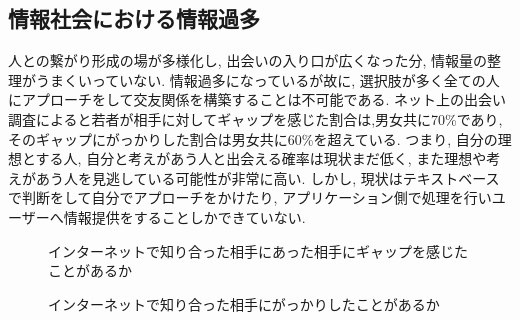 \subsection{情報社会における情報過多}
人との繋がり形成の場が多様化し, 出会いの入り口が広くなった分, 情報量の整理がうまくいっていない.
情報過多になっているが故に, 選択肢が多く全ての人にアプローチをして交友関係を構築することは不可能である.
ネット上の出会い調査によると若者が相手に対してギャップを感じた割合は,男女共に70\%であり,
そのギャップにがっかりした割合は男女共に60\%を超えている.\cite{mandam}
つまり, 自分の理想とする人, 自分と考えがあう人と出会える確率は現状まだ低く, また理想や考えがあう人を見逃している可能性が非常に高い.
しかし, 現状はテキストベースで判断をして自分でアプローチをかけたり, アプリケーション側で処理を行いユーザーへ情報提供をすることしかできていない.
\begin{figure}[htbp]
    \begin{center}
    \end{center}
    \caption{インターネットで知り合った相手にあった相手にギャップを感じたことがあるか}
    \label{fig:onlinemeeting_to_real}
\end{figure}

\begin{figure}[htbp]
    \begin{center}
    \end{center}
    \caption{インターネットで知り合った相手にがっかりしたことがあるか}
    \label{fig:onlinemeeting_to_real}
\end{figure}

